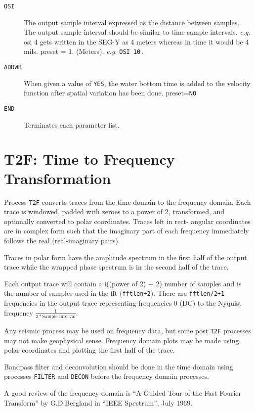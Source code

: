 \begin{description}
\item[\texttt{OSI}] The output sample interval expressed as the distance between
         samples.  The output sample interval should be similar to time
         sample  intervals.  \textit{e.g.}  osi 4 gets written in the SEG-Y as 4
         meters whereas in time it would be 4 mils.
         \Gls{preset} = 1. (Meters).  \textit{e.g.}  \texttt{OSI 10.}

\item[\texttt{ADDWB}] When given a value of \texttt{YES}, the water bottom time is added to the
         velocity function after spatial variation has been done.
         \Gls{preset}=\texttt{NO}

\item[\texttt{END}] Terminates each parameter list.
\end{description}

\section{T2F: Time to Frequency Transformation}
\label{cmd_t2f}

Process \texttt{T2F} converts traces from the time domain to the frequency domain.
Each trace is windowed, padded with zeroes to a power of 2, transformed,
and optionally converted to polar coordinates.  Traces left in rect-
angular coordinates are in complex form such that the imaginary part of
each frequency immediately follows the real (real-imaginary pairs).

Traces in polar form have the amplitude spectrum in the first half of the
output trace while the wrapped phase spectrum is in the second half of
the trace.

Each output trace will contain a i((power of 2) + 2) number of samples and is
the number of samples used in the \gls{fft} (\texttt{fftlen+2}).  There are \texttt{fftlen/2+1}
frequencies in the output trace representing frequencies 0 (DC) to the
Nyquist frequency $\frac{1}{2 * \mbox{Sample interval}}$.

Any seismic process may be used on frequency data, but some post \texttt{T2F}
processes may not make geophysical sense.  Frequency domain plots may be
made using polar coordinates and plotting the first half of the trace.

Bandpass filter and deconvolution should be done in the time domain using
processes \texttt{FILTER} and \texttt{DECON} before the frequency domain processes.

A good review of the frequency domain is ``A Guided Tour of the Fast Fourier Transform'' by G.D.Bergland in ``IEEE Spectrum'', July 1969. \cite{fft_1969}

